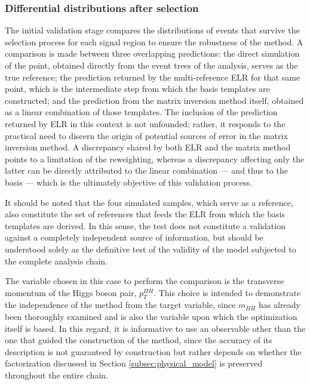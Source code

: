 \subsubsection{Differential distributions after selection}
%
The initial validation stage compares the distributions of events that survive the selection process for each signal region to ensure the robustness of the method.  A comparison is made between three overlapping predictions: the direct simulation of the point, obtained directly from the event trees of the analysis, serves as the true reference; the prediction returned by the multi-reference ELR for that same point, which is the intermediate step from which the basis templates are constructed; and the prediction from the matrix inversion method itself, obtained as a linear combination of those templates. The inclusion of the prediction returned by ELR in this context is not unfounded; rather, it responds to the practical need to discern the origin of potential sources of error in the matrix inversion method. A discrepancy shared by both ELR and the matrix method points to a limitation of the reweighting, whereas a discrepancy affecting only the latter can be directly attributed to the linear combination — and thus to the basis — which is the ultimately objective of this validation process.

It should be noted that the four simulated samples, which serve as a reference, also constitute the set of references that feeds the ELR from which the basis templates are derived. In this sense, the test does not constitute a validation against a completely independent source of information, but should be understood solely as the definitive test of the validity of the model subjected to the complete analysis chain.\medskip

The variable chosen in this case to perform the comparison is the transverse momentum of the Higgs boson pair, $p_T^{HH}$. This choice is intended to demonstrate the independence of the method from the target variable, since $m_{HH}$ has already been thoroughly examined and is also the variable upon which the optimization itself is based. In this regard, it is informative to use an observable other than the one that guided the construction of the method, since the accuracy of its description is not guaranteed by construction but rather depends on whether the factorization discussed in Section \ref{subsec:physical_model} is preserved throughout the entire chain.\medskip

